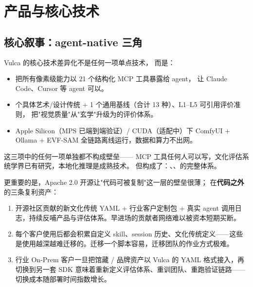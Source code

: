 \section{产品与核心技术}
\label{sec:product}

\subsection{核心叙事：agent-native 三角}

Vulca 的核心技术差异化不是任何一项单点技术，
而是：

\begin{itemize}
  \item {}\quad 把所有像素级能力以 21 个结构化 MCP 工具暴露给 agent，
  让 Claude Code、Cursor 等 agent 可以。
  \item {} 个具体艺术/设计传统 + 1 个通用基线（合计 13 种）、L1–L5 可引用评价准则，
  把"视觉质量"从"玄学"升级为的评价体系。
  \item {}\quad Apple Silicon（MPS 已端到端验证）/ CUDA（适配中）下 ComfyUI + Ollama + EVF-SAM
  全链路离线运行，数据和算力不出网。
\end{itemize}

这三项中的任何一项单独都不构成壁垒——
MCP 工具任何人可以写，文化评估系统学界已有研究，本地化推理是成熟技术。
但构成了：、、的完整体系。

更重要的是，Apache 2.0 开源让"代码可被复制"这一层的壁垒很薄；
在\textbf{代码之外}的三条复利资产：

\begin{enumerate}
  \item {}\quad 开源社区贡献的新文化传统 YAML + 行业客户定制包 + 真实 agent 调用日志，持续反哺产品与评估体系。早进场的贡献者网络难以被资本短期买断。
  \item {}\quad 每个客户使用后都会积累自定义 skill、session 历史、文化传统定义——这些是使用越深越难迁移的。迁移一个脚本容易，迁移团队的作业方式极难。
  \item {}\quad 行业 On-Prem 客户一旦把馆藏 / 品牌资产以 Vulca 的 YAML 格式接入，再切换到另一套 SDK 意味着重新定义评估体系、重训团队、重跑验证链路——切换成本随部署时间指数增长。
\end{enumerate}

